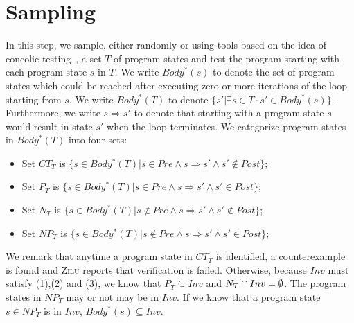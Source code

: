 
\section{Sampling}
In this step, we sample, either randomly or using tools based on the idea of concolic testing~\cite{}, a set $T$ of program states and test the program starting with each program state $s$ in $T$. We write $Body^*(s)$ to denote the set of program states which could be reached after executing zero or more iterations of the loop starting from $s$. We write $Body^*(T)$ to denote $\{s' | \exists s \in T \cdot s' \in Body^*(s)\}$. Furthermore, we write $s \Rightarrow s'$ to denote that starting with a program state $s$ would result in state $s'$ when the loop terminates. We categorize program states in $Body^*(T)$ into four sets:
\begin{itemize}
    \item Set $CT_T$ is $\{s \in Body^*(T) | s \in Pre \land s \Rightarrow s' \land s' \nin Post\}$;
    \item Set $P_T$ is $\{s \in Body^*(T) | s \in Pre \land s \Rightarrow s' \land s' \in Post\}$;
    \item Set $N_T$ is $\{s \in Body^*(T) | s \nin Pre \land s \Rightarrow s' \land s' \nin Post\}$;
    \item Set $NP_T$ is $\{s \in Body^*(T) | s \nin Pre \land s \Rightarrow s' \land s' \in Post\}$;
\end{itemize}
We remark that anytime a program state in $CT_T$ is identified, a counterexample is found and \textsc{Zilu} reports that verification is failed. Otherwise, because $Inv$ must satisfy (1),(2) and (3), we know that $P_T \subseteq Inv$ and $N_T \cap Inv = \emptyset$. The program states in $NP_T$ may or not may be in $Inv$. If we know that a program state $s \in NP_T$ is in $Inv$, $Body^*(s) \subseteq Inv$.

\begin{example}
\end{example}